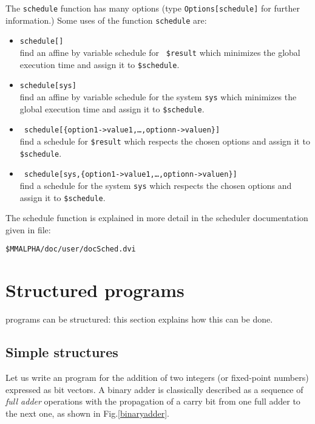 The \texttt{schedule} function has many options 
(type {\tt Options[schedule]} for further information.)
Some uses of the function {\tt schedule} are:
\begin{itemize}
\item {\tt schedule[]}\\ find an affine by variable schedule  for {\tt
\$result} which minimizes the global execution time and assign it to
{\tt \$schedule}.
\item {\tt schedule[sys]}\\ find an affine by variable schedule for
the {\Alpha} system {\tt sys} which minimizes the global execution
time and assign it to {\tt \$schedule}.
\item {\tt
schedule[\{option1->value1,\ldots,optionn->valuen\}]}\\
find a schedule for {\tt \$result} which respects the chosen options and
assign it to {\tt \$schedule}.
\item {\tt
schedule[sys,\{option1->value1,\ldots,optionn->valuen\}]}\\
find a schedule for the {\Alpha} system {\tt sys} which respects the chosen options and
assign it to {\tt \$schedule}.
\end{itemize}
The schedule function is explained in more detail in
the scheduler documentation
given in file:
\begin{verbatim}
$MMALPHA/doc/user/docSched.dvi
\end{verbatim}

\section{Structured  {\Alpha} programs}
\label{chapstart:sectstruct}

\alfa{} programs can be structured: this section explains 
how this can be done. 

\subsection{Simple structures} 
Let us write an {\alfa} program for the addition of two integers
(or fixed-point numbers) expressed as bit vectors.  A binary
adder is classically described as a sequence of \emph{full adder}
operations with the propagation of a carry bit from one full adder to
the next one, as shown in Fig.\ref{binaryadder}.

